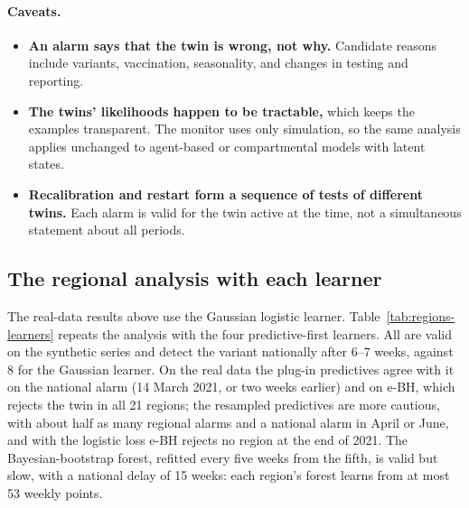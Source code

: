 \paragraph{Caveats.}
\begin{itemize}
  \item \textbf{An alarm says that the twin is wrong, not why.} Candidate
        reasons include variants, vaccination, seasonality, and changes in
        testing and reporting.
  \item \textbf{The twins' likelihoods happen to be tractable,} which keeps the
        examples transparent. The monitor uses only simulation, so the same
        analysis applies unchanged to agent-based or compartmental models with
        latent states.
  \item \textbf{Recalibration and restart form a sequence of tests of
        different twins.} Each alarm is valid for the twin active at the time,
        not a simultaneous statement about all periods.
\end{itemize}


\subsection{The regional analysis with each learner}

The real-data results above use the Gaussian logistic learner.
Table~\ref{tab:regions-learners} repeats the analysis with the four
predictive-first learners. All are valid on the synthetic series and detect
the variant nationally after 6--7 weeks, against 8 for the Gaussian learner. On
the real data the plug-in predictives agree with it on the national alarm (14
March 2021, or two weeks earlier) and on e-BH, which rejects the twin in all 21
regions; the resampled predictives are more cautious, with about half as many
regional alarms and a national alarm in April or June, and with the logistic
loss e-BH rejects no region at the end of 2021. The Bayesian-bootstrap forest,
refitted every five weeks from the fifth, is valid but slow, with a national
delay of 15 weeks: each region's forest learns from at most 53 weekly points.

